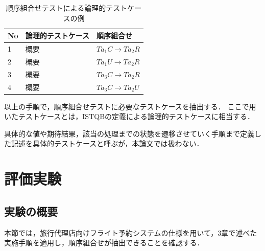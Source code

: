 \begin{table}[t]
  \centering
  \caption{順序組合せテストによる論理的テストケースの例}
    \begin{tabular}{l|l|l}
    No & 論理的テストケース & 順序組合せ \\
    \hline
    1 & 概要 & $Ta_1C \rightarrow Ta_2R$ \\
    \hline
    2 & 概要 & $Ta_1U \rightarrow Ta_2R$ \\
    \hline
    3 & 概要 & $Ta_3C \rightarrow Ta_2R$ \\
    \hline
    4 & 概要 & $Ta_3C \rightarrow Ta_2U$ \\
    \hline
    \end{tabular}%
\label{TCLISTSAMPLE}
\end{table}%

以上の手順で，順序組合せテストに必要なテストケースを抽出する．
ここで用いたテストケースとは，ISTQBの定義による論理的テストケースに相当する\cite{ISTQB}．

具体的な値や期待結果，該当の処理までの状態を遷移させていく手順まで定義した記述を具体的テストケースと呼ぶが，本論文では扱わない．

\newpage
\section{評価実験} \label{sec:5-3}
\subsection{実験の概要} \label{sec:5-3-1}

本節では，旅行代理店向けフライト予約システムの仕様を用いて，3章で述べた実施手順を適用し，順序組合せが抽出できることを確認する．


